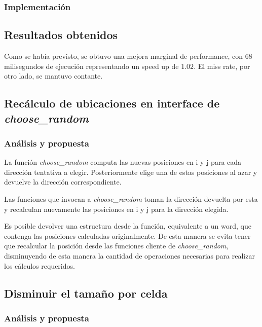 \documentclass[a4paper,11pt]{article}
\begin{document}
\subsubsection{Implementación}



\subsection{Resultados obtenidos}

Como se había previsto, se obtuvo una mejora marginal de performance, con 68
milisegundos de ejecución representando un speed up de \(1.02\). El miss rate,
por otro lado, se mantuvo contante.

\subsection{Recálculo de ubicaciones en interface de \textit{choose\_random}}

\subsubsection{Análisis y propuesta}

La función \textit{choose\_random} computa las nuevas posiciones en i y j para
cada dirección tentativa a elegir. Posteriormente elige una de estas posiciones
al azar y devuelve la dirección correspondiente.

Las funciones que invocan a \textit{choose\_random} toman la dirección devuelta
por esta y recalculan nuevamente las posiciones en i y j para la dirección
elegida.

Es posible devolver una estructura desde la función, equivalente a un word, que
contenga las posiciones calculadas originalmente. De esta manera se evita tener
que recalcular la posición desde las funciones cliente de
\textit{choose\_random}, disminuyendo de esta manera la cantidad de operaciones
necesarias para realizar los cálculos requeridos.

\subsection{Disminuir el tamaño por celda}

\subsubsection{Análisis y propuesta}
\end{document}
